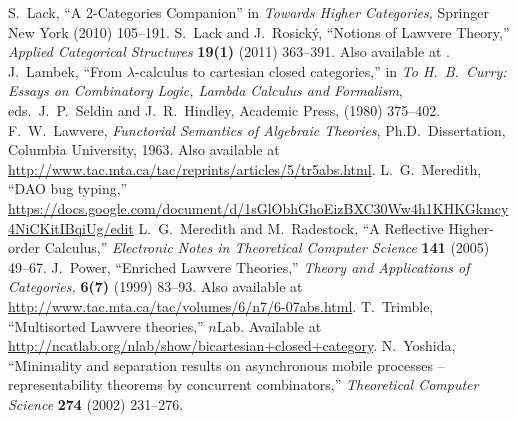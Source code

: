 \documentclass[submission,copyright,creativecommons]{eptcs}
\begin{document}
\begin{thebibliography}{99}
 S.\ Lack, ``A 2-Categories Companion'' in {\em Towards Higher Categories,} Springer New York (2010) 105--191.
 S.\ Lack and J.\ Rosick{\'{y}}, ``Notions of Lawvere Theory,'' {\em Applied Categorical Structures} {\bf 19(1)} (2011) 363--391.  Also available at .
 J.\ Lambek, ``From $\lambda$-calculus to cartesian closed categories,'' in {\sl To H.\ B.\ Curry: Essays on Combinatory Logic, Lambda Calculus and Formalism}, eds.\ J.\ P.\ Seldin and J.\ R.\ Hindley, Academic Press, (1980) 375--402. 
 F.\ W.\ Lawvere, {\sl Functorial Semantics of Algebraic Theories}, Ph.D.\ Dissertation, Columbia University, 1963. Also available at \href{http://www.tac.mta.ca/tac/reprints/articles/5/tr5abs.html}{http://www.tac.mta.ca/tac/reprints/articles/5/tr5abs.html}.
 L.\ G.\ Meredith, ``DAO bug typing,'' \href{https://docs.google.com/document/d/1sGlObhGhoEizBXC30Ww4h1KHKGkmcy4NiCKitIBqiUg/edit}{https://docs.google.com/document/d/1sGlObhGhoEizBXC30Ww4h1KHKGkmcy4NiCKitIBqiUg/edit}
 L.\ G.\ Meredith and M.\ Radestock, ``A Reflective Higher-order Calculus,'' {\em Electronic Notes in Theoretical Computer Science} {\bf 141} (2005) 49--67.
 J.\ Power, ``Enriched Lawvere Theories,'' {\em Theory and Applications of Categories,} {\bf 6(7)} (1999) 83--93.  Also available at \href{http://www.tac.mta.ca/tac/volumes/6/n7/6-07abs.html}{http://www.tac.mta.ca/tac/volumes/6/n7/6-07abs.html}.
 T.\ Trimble, ``Multisorted Lawvere theories,'' $n$Lab.  Available at \href{http://ncatlab.org/nlab/show/bicartesian+closed+category}{http://ncatlab.org/nlab/show/bicartesian+closed+category}.
 N.\ Yoshida, ``Minimality and separation results on asynchronous mobile processes – representability theorems by concurrent combinators,'' {\em Theoretical Computer Science} {\bf 274} (2002) 231--276.

\end{thebibliography}
\end{document}
